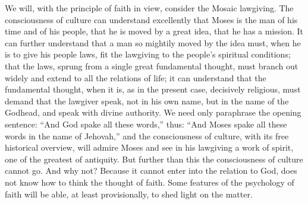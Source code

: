 \documentclass[12pt]{book}
\newcommand{\opage}[1]{\marginnote{\footnotesize\textit{[#1]}}}
\begin{document}
We will, with the principle of faith in view, consider the Mosaic
lawgiving. The consciousness of culture can understand excellently that
Moses is the man of his time and of his people, that he is moved by a
great idea, that he has a mission. It can further understand that a man
so mightily moved by the idea must, when he is to give his people laws,
fit the lawgiving to the people's spiritual conditions; that the laws,
sprung from a single great fundamental thought, must branch out widely and
extend to all the relations of life; it can understand that the
fundamental thought, when it is, as in the present case, decisively
religious, must demand that the lawgiver speak, not in his own name, but
in the name of the Godhead, and speak with divine authority. We need only
paraphrase the opening sentence: ``And God spake all these words,'' thus:
``And Moses spake all these words in the name of Jehovah,'' and
\opage{185}\setcounter{footnote}{0}%
the consciousness of culture, with its free historical overview, will
admire Moses and see in his lawgiving a work of spirit, one of the
greatest of antiquity. But further than this the consciousness of culture
cannot go. And why not? Because it cannot enter into the relation to God,
does not know how to think the thought of faith. Some features of the
psychology of faith will be able, at least provisionally, to shed light on
the matter.
\end{document}
